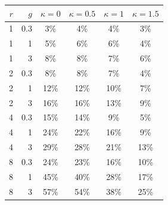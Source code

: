 \begin{tabular}{rrcccc}\toprule
$r$ & $g$ & $\kappa{=}0$ & $\kappa{=}0.5$ & $\kappa{=}1$ & $\kappa{=}1.5$ \\\midrule
1 & 0.3 & 3\% & 4\% & 4\% & 3\% \\
1 & 1 & 5\% & 6\% & 6\% & 4\% \\
1 & 3 & 8\% & 8\% & 7\% & 6\% \\
2 & 0.3 & 8\% & 8\% & 7\% & 4\% \\
2 & 1 & 12\% & 12\% & 10\% & 7\% \\
2 & 3 & 16\% & 16\% & 13\% & 9\% \\
4 & 0.3 & 15\% & 14\% & 9\% & 5\% \\
4 & 1 & 24\% & 22\% & 16\% & 9\% \\
4 & 3 & 29\% & 28\% & 21\% & 13\% \\
8 & 0.3 & 24\% & 23\% & 16\% & 10\% \\
8 & 1 & 45\% & 40\% & 28\% & 17\% \\
8 & 3 & 57\% & 54\% & 38\% & 25\% \\
\bottomrule
\end{tabular}

